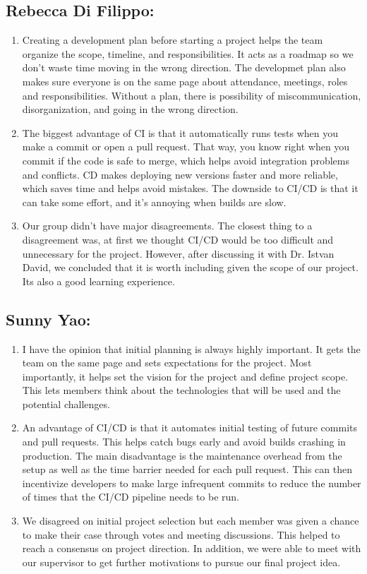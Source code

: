 \documentclass{article}
\begin{document}
\subsection*{Rebecca Di Filippo:}\label{subsec:rebecca-difilippo-reflection}
\begin{enumerate}
  \item Creating a development plan before starting a project helps the team organize the scope,
   timeline, and responsibilities. It acts as a roadmap so we don’t waste time
    moving in the wrong direction. The developmet plan also makes sure everyone is on the same page 
    about attendance, meetings, roles and responsibilities. Without a plan, there is possibility of miscommunication,
    disorganization, and going in the wrong direction.
  \item The biggest advantage of CI is that it automatically runs tests when you make a commit
   or open a pull request. That way, you know right when you commit if the code is safe to merge, which helps 
   avoid integration problems and conflicts. CD makes deploying new versions faster and more reliable,
    which saves time and helps avoid mistakes. The downside to CI/CD is that it can take some effort,
    and it’s annoying when builds are slow.
  \item Our group didn’t have major disagreements. The closest thing to a disagreement was, at first we
  thought CI/CD would be too difficult and unnecessary for the project. However, after discussing it
  with Dr. Istvan David, we concluded that it is worth including given the scope of our project. Its also
  a good learning experience.
\end{enumerate}

\subsection*{Sunny Yao:}\label{subsec:sunny-yao-reflection}
\begin{enumerate}
  \item I have the opinion that initial planning is always highly important.
  It gets the team on the same page and sets expectations for the project.
  Most importantly, it helps set the vision for the project and define project scope.
  This lets members think about the technologies that will be used and the potential challenges.
  \item An advantage of CI/CD is that it automates initial testing of future
commits and pull requests. This helps catch bugs early and avoid builds crashing in production.
The main disadvantage is the maintenance overhead from the setup as well as the
time barrier needed for each pull request. This can then incentivize
developers to make large infrequent commits to reduce the number of times that
the CI/CD pipeline needs to be run.
  \item We disagreed on initial project selection but each member was given
a chance to make their case through votes and meeting discussions. This helped to
reach a consensus on project direction. In addition, we were able to meet with our
supervisor to get further motivations to pursue our final project idea.
\end{enumerate}
\end{document}
